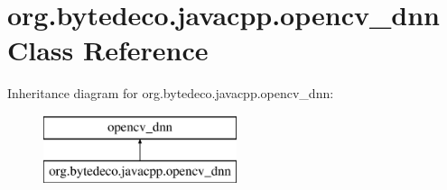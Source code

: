 \hypertarget{classorg_1_1bytedeco_1_1javacpp_1_1opencv__dnn}{}\section{org.\+bytedeco.\+javacpp.\+opencv\+\_\+dnn Class Reference}
\label{classorg_1_1bytedeco_1_1javacpp_1_1opencv__dnn}
Inheritance diagram for org.\+bytedeco.\+javacpp.\+opencv\+\_\+dnn\+:\begin{figure}[H]
\begin{center}
\leavevmode
\includegraphics[height=2.000000cm]{classorg_1_1bytedeco_1_1javacpp_1_1opencv__dnn}
\end{center}
\end{figure}
